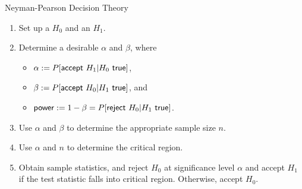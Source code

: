 \begin{frame}{Neyman-Pearson Decision Theory}

\begin{enumerate}
	\justifying
	\item Set up a  $H_0$ and an  $H_1$.
	\item Determine a desirable $\alpha$ and $\beta$, where
	\begin{itemize}
		\item $\alpha := P[\U{accept\ } H_1|H_0 \U{\ true}]$,
		\item $\beta := P[\U{accept\ } H_0|H_1 \U{\ true}]$, and
		\item $\U{power} := 1 - \beta = P[\U{reject\ } H_0|H_1 \U{\ true}]$.
	\end{itemize}
	\item Use $\alpha$ and $\beta$ to determine the appropriate sample size $n$. \highlightr{$\Delta$}
	\item Use $\alpha$ and $n$ to determine the critical region. \highlightr{$\Delta$}
	\item Obtain sample statistics, and reject $H_0$ at significance level $\alpha$ and accept $H_1$ if the test statistic falls into critical region. Otherwise, accept $H_0$.
\end{enumerate}

\end{frame}

